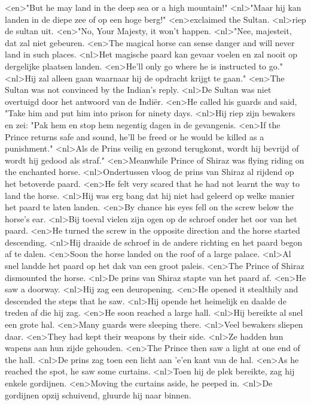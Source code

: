<en>"But he may land in the deep sea or a high mountain!"
<nl>"Maar hij kan landen in de diepe zee of op een hoge berg!"
<en>exclaimed the Sultan.
<nl>riep de sultan uit.
<en>"No, Your Majesty, it won't happen.
<nl>"Nee, majesteit, dat zal niet gebeuren.
<en>The magical horse can sense danger and will never land in such places.
<nl>Het magische paard kan gevaar voelen en zal nooit op dergelijke plaatsen landen.
<en>He'll only go where he is instructed to go."
<nl>Hij zal alleen gaan waarnaar hij de opdracht krijgt te gaan."
<en>The Sultan was not convinced by the Indian's reply.
<nl>De Sultan was niet overtuigd door het antwoord van de Indi\"er.
<en>He called his guards and said, "Take him and put him into prison for ninety days.
<nl>Hij riep zijn bewakers en zei: "Pak hem en stop hem  negentig dagen in de gevangenis.
<en>If the Prince returns safe and sound, he'll be freed or he would be killed as a punishment."
<nl>Als de Prins veilig en gezond terugkomt, wordt hij bevrijd of wordt hij  gedood als straf."
<en>Meanwhile Prince of Shiraz was flying riding on the enchanted horse.
<nl>Ondertussen vloog de prins van Shiraz al rijdend op het betoverde paard.
<en>He felt very scared that he had not learnt the way to land the horse.
<nl>Hij was erg bang dat hij  niet had geleerd op welke manier het paard te laten landen.
<en>By chance his eyes fell on the screw below the horse's ear.
<nl>Bij toeval vielen zijn ogen op de schroef onder het oor van het paard.
<en>He turned the screw in the opposite direction and the horse started descending.
<nl>Hij draaide de schroef in de andere richting en het paard begon af te dalen.
<en>Soon the horse landed on the roof of a large palace.
<nl>Al snel landde het paard op het dak van een groot paleis.
<en>The Prince of Shiraz dismounted the horse.
<nl>De prins van Shiraz stapte van het paard af.
<en>He saw a doorway.
<nl>Hij zag een deuropening.
<en>He opened it stealthily and descended the steps that he saw.
<nl>Hij opende het heimelijk en daalde de treden af die hij zag.
<en>He soon reached a large hall.
<nl>Hij bereikte al snel een grote hal.
<en>Many guards were sleeping there.
<nl>Veel bewakers sliepen daar.
<en>They had kept their weapons by their side.
<nl>Ze hadden hun wapens aan hun zijde gehouden.
<en>The Prince then saw a light at one end of the hall.
<nl>De prins zag toen een licht aan 'e'en kant van de hal.
<en>As he reached the spot, he saw some curtains.
<nl>Toen hij de plek bereikte, zag hij enkele gordijnen.
<en>Moving the curtains aside, he peeped in.
<nl>De gordijnen opzij schuivend,  gluurde hij  naar binnen.
